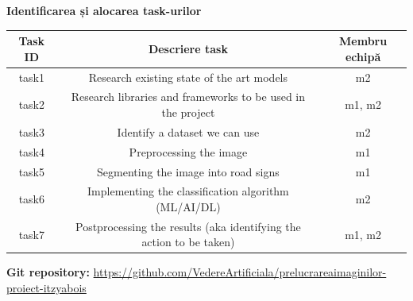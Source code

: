 \documentclass{article}
\begin{document}



\textbf{Identificarea și alocarea task-urilor}

\begin{center}
\begin{tabular}{ |c|c|c| }
 \hline
 \textbf{Task ID} & \textbf{Descriere task} & \textbf{Membru echipă} \\
  \hline
 task1 & Research existing state of the art models & m2 \\ %
  \hline
 task2 & Research libraries and frameworks to be used in the project & m1, m2 \\
 \hline
 task3 & Identify a dataset we can use & m2 \\
 \hline
 task4 & Preprocessing the image & m1 \\
 \hline
 task5 & Segmenting the image into road signs & m1 \\
 \hline
 task6 & Implementing the classification algorithm (ML/AI/DL) & m2 \\
 \hline
 task7 & Postprocessing the results (aka identifying the action to be taken) & m1, m2 \\
 \hline
\end{tabular}
\end{center}

\textbf{Git repository:} \url{https://github.com/VedereArtificiala/prelucrareaimaginilor-proiect-itzyabois}






\end{document}
